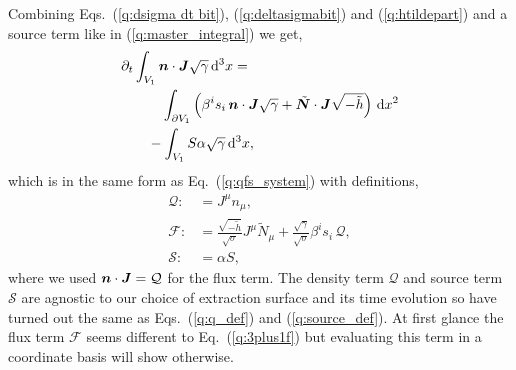 Combining Eqs.~(\ref{q:dsigma dt bit}), (\ref{q:deltasigmabit}) and (\ref{q:htildepart}) and a source term like in (\ref{q:master_integral}) we get,
\begin{align}
 \partial_t &\int_{V_1} \boldsymbol{n} \cdot \boldsymbol{J} \sqrt{\gamma} \,\dd^3 x =\nonumber \\
 &\quad\quad\int_{\partial V_1} \left( \beta^i s_i\, \boldsymbol{n} \cdot \boldsymbol{J} \sqrt{\gamma}  + \tilde{\boldsymbol N} \cdot \boldsymbol{J} \sqrt{-\tilde{h}} \right) \, \dd x^2 \nonumber \\
 &\quad-\int_{V_1} S \alpha \sqrt{\gamma} \, \dd^3 x,
\end{align}
which is in the same form as Eq.~(\ref{q:qfs_system}) with definitions,
\begin{align}
\mathcal{Q} :&= J^\mu n_\mu, \\
\label{q:unfinished_flux}\mathcal{F} :&= \frac{\sqrt{-\tilde h}}{\sqrt{\sigma}}J^\mu \tilde N_\mu +  \frac{\sqrt{\gamma}}{\sqrt{\sigma}}\beta^i s_i\, \mathcal{Q} , \\
\mathcal{S} :&= \alpha S,
\end{align} 
where we used $\boldsymbol{n} \cdot \boldsymbol{J} = \mathcal{Q}$ for the flux term. The density term $\mathcal{Q}$ and source term $\mathcal{S}$ are agnostic to our choice of extraction surface and its time evolution so have turned out the same as Eqs.~(\ref{q:q_def}) and (\ref{q:source_def}). At first glance the flux term $\mathcal{F}$ seems different to Eq.~(\ref{q:3plus1f}) but evaluating this term in a coordinate basis will show otherwise.


